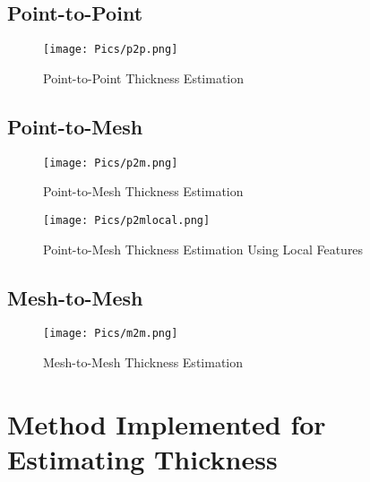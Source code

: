 \subsection{Point-to-Point}
\begin{figure}[h]
    \centering
    \texttt{[image: Pics/p2p.png]}
    \caption{Point-to-Point Thickness Estimation}
    \label{fig:p2pdia}
\end{figure}
\subsection{Point-to-Mesh}
\begin{figure}[h]
    \centering
    \texttt{[image: Pics/p2m.png]}
    \caption{Point-to-Mesh Thickness Estimation}
    \label{fig:p2mdia}
\end{figure}
\begin{figure}[h]
    \centering
    \texttt{[image: Pics/p2mlocal.png]}
    \caption{Point-to-Mesh Thickness Estimation Using Local Features}
    \label{fig:p2mlocaldia}
\end{figure}
\subsection{Mesh-to-Mesh}
\begin{figure}[h]
    \centering
    \texttt{[image: Pics/m2m.png]}
    \caption{Mesh-to-Mesh Thickness Estimation}
    \label{fig:m2mdia}
\end{figure}

\section{Method Implemented for Estimating Thickness}